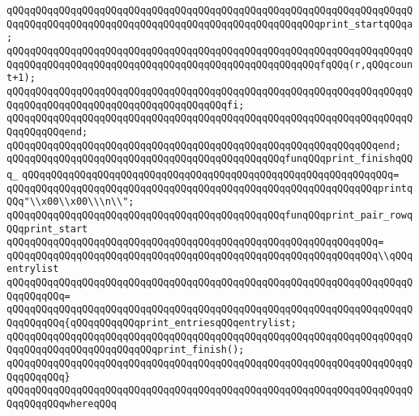 \verb|qQQqqQQqqQQqqQQqqQQqqQQqqQQqqQQqqQQqqQQqqQQqqQQqqQQqqQQqqQQqqQQqqQQqqQQqqQQqqQQqqQQqqQQqqQQqqQQqqQQqqQQqqQQqqQQqqQQqqQQqqQQqprint_startqQQqa;|\newline
\verb|qQQqqQQqqQQqqQQqqQQqqQQqqQQqqQQqqQQqqQQqqQQqqQQqqQQqqQQqqQQqqQQqqQQqqQQqqQQqqQQqqQQqqQQqqQQqqQQqqQQqqQQqqQQqqQQqqQQqqQQqqQQqfqQQq(r,qQQqcount+1);|\newline
\verb|qQQqqQQqqQQqqQQqqQQqqQQqqQQqqQQqqQQqqQQqqQQqqQQqqQQqqQQqqQQqqQQqqQQqqQQqqQQqqQQqqQQqqQQqqQQqqQQqqQQqqQQqqQQqfi;|\newline
\verb|qQQqqQQqqQQqqQQqqQQqqQQqqQQqqQQqqQQqqQQqqQQqqQQqqQQqqQQqqQQqqQQqqQQqqQQqqQQqqQQqend;|\newline
\verb|qQQqqQQqqQQqqQQqqQQqqQQqqQQqqQQqqQQqqQQqqQQqqQQqqQQqqQQqqQQqqQQqend;|\newline
\newline
\verb|qQQqqQQqqQQqqQQqqQQqqQQqqQQqqQQqqQQqqQQqqQQqqQQqfunqQQqprint_finishqQQq_|\newline
\verb|qQQqqQQqqQQqqQQqqQQqqQQqqQQqqQQqqQQqqQQqqQQqqQQqqQQqqQQqqQQqqQQq=|\newline
\verb|qQQqqQQqqQQqqQQqqQQqqQQqqQQqqQQqqQQqqQQqqQQqqQQqqQQqqQQqqQQqqQQqprintqQQq"\\x00\\x00\\\n\\";|\newline
\newline
\verb|qQQqqQQqqQQqqQQqqQQqqQQqqQQqqQQqqQQqqQQqqQQqqQQqfunqQQqprint_pair_rowqQQqprint_start|\newline
\verb|qQQqqQQqqQQqqQQqqQQqqQQqqQQqqQQqqQQqqQQqqQQqqQQqqQQqqQQqqQQqqQQq=|\newline
\verb|qQQqqQQqqQQqqQQqqQQqqQQqqQQqqQQqqQQqqQQqqQQqqQQqqQQqqQQqqQQqqQQq\\qQQqentrylist|\newline
\verb|qQQqqQQqqQQqqQQqqQQqqQQqqQQqqQQqqQQqqQQqqQQqqQQqqQQqqQQqqQQqqQQqqQQqqQQqqQQqqQQq=|\newline
\verb|qQQqqQQqqQQqqQQqqQQqqQQqqQQqqQQqqQQqqQQqqQQqqQQqqQQqqQQqqQQqqQQqqQQqqQQqqQQqqQQq{qQQqqQQqqQQqprint_entriesqQQqentrylist;|\newline
\verb|qQQqqQQqqQQqqQQqqQQqqQQqqQQqqQQqqQQqqQQqqQQqqQQqqQQqqQQqqQQqqQQqqQQqqQQqqQQqqQQqqQQqqQQqqQQqqQQqprint_finish();|\newline
\verb|qQQqqQQqqQQqqQQqqQQqqQQqqQQqqQQqqQQqqQQqqQQqqQQqqQQqqQQqqQQqqQQqqQQqqQQqqQQqqQQq}|\newline
\verb|qQQqqQQqqQQqqQQqqQQqqQQqqQQqqQQqqQQqqQQqqQQqqQQqqQQqqQQqqQQqqQQqqQQqqQQqqQQqqQQqwhereqQQq|\newline
